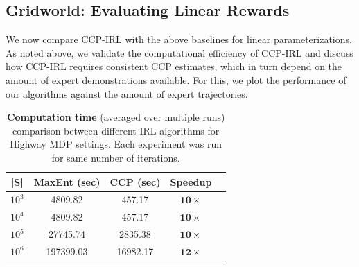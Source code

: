 \documentclass{article}
\begin{document}

\subsection{Gridworld: Evaluating Linear Rewards} 

We now compare CCP-IRL with the above baselines for linear parameterizations. As noted above, we validate the computational efficiency of CCP-IRL and discuss how CCP-IRL requires consistent CCP estimates, which in turn depend on the amount of expert demonstrations available. For this, we plot the performance of our algorithms against the amount of expert trajectories.

\begin{table}[t]
\centering
\def\arraystretch{1.3}%
\begin{tabular}{|c|c|c|c|c|}
\hline
|S| & MaxEnt (sec) & CCP (sec) & Speedup \\\hline
$10^3$ & 4809.82 & 457.17  &  $\mathbf{10}\times$ \\
$10^4$ & 4809.82 & 457.17 & $\mathbf{10}\times$ \\
$10^5$ & 27745.74 & 2835.38 & $\mathbf{10}\times$ \\
$10^6$ & 197399.03 & 16982.17 & $\mathbf{12}\times$ \\
\hline
\end{tabular}
\caption{\textbf{Computation time} (averaged over multiple runs) comparison between different IRL algorithms for Highway MDP settings. Each experiment was run for same number of iterations.
}
\label{table:table_results_macro_cells}
\end{table}
\end{document}

